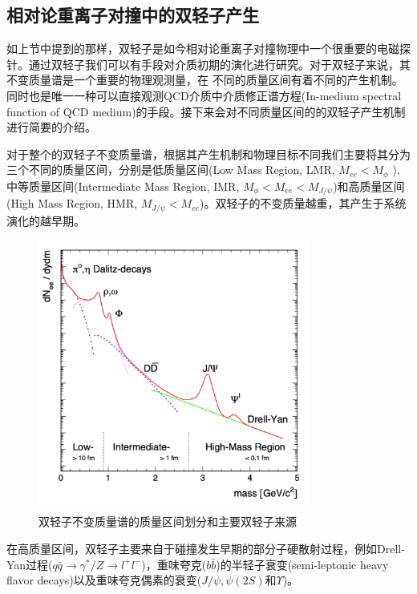\subsection{相对论重离子对撞中的双轻子产生}

如上节中提到的那样，双轻子是如今相对论重离子对撞物理中一个很重要的电磁探针。通过双轻子我们可以有手段对介质初期的演化进行研究。对于双轻子来说，其不变质量谱是一个重要的物理观测量，在 不同的质量区间有着不同的产生机制。同时也是唯一一种可以直接观测QCD介质中介质修正谱方程(In-medium spectral function of QCD medium)的手段。接下来会对不同质量区间的的双轻子产生机制进行简要的介绍。

对于整个的双轻子不变质量谱，根据其产生机制和物理目标不同我们主要将其分为三个不同的质量区间，分别是低质量区间(Low Mass Region, LMR, $M_{ee} < M_{\phi}$ ),中等质量区间(Intermediate Mass Region, IMR, $M_{\phi} < M_{ee} < M_{J/\psi}$)和高质量区间(High Mass Region, HMR, $M_{J/\psi} < M_{ee}$)。双轻子的不变质量越重，其产生于系统演化的越早期。

\begin{figure}[htb]
    \begin{center}
    \includegraphics[width=0.8\textwidth,clip]{figures/Chapter1/DileptonSpectra.png}
    \end{center}
    \caption[双轻子不变质量谱示意图]{双轻子不变质量谱的质量区间划分和主要双轻子来源}
    \label{fig:DileptonSpectra}
\end{figure}

在高质量区间，双轻子主要来自于碰撞发生早期的部分子硬散射过程，例如Drell-Yan过程($q\bar{q} \rightarrow \gamma^*/Z \rightarrow l^{+}l^{-}$)，重味夸克($b\bar{b}$)的半轻子衰变(semi-leptonic heavy flavor decays)以及重味夸克偶素的衰变($J/\psi, \psi(2S)$和$\Upsilon$)。

